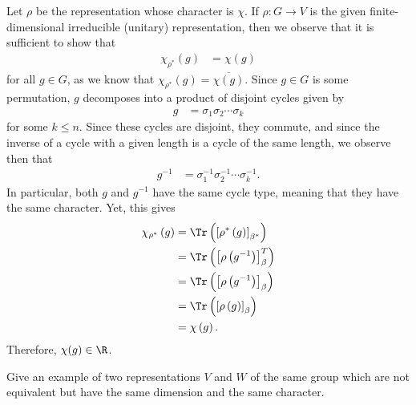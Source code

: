 \documentclass[10pt]{mypackage}
\begin{document}
\begin{solution}
  Let $\rho$ be the representation whose character is $\chi$. If $\rho\colon G\rightarrow V$ is the given finite-dimensional irreducible (unitary) representation, then we observe that it is sufficient to show that
  \begin{align*}
    \chi_{\rho^{\ast}}\left( g \right) &= \chi\left( g \right)
  \end{align*}
  for all $g\in G$, as we know that $\chi_{\rho^{\ast}}\left( g \right) = \overline{\chi\left( g \right)}$. Since $g\in G$ is some permutation, $g$ decomposes into a product of disjoint cycles given by
  \begin{align*}
    g &= \sigma_1\sigma_2\cdots \sigma_k
  \end{align*}
  for some $k\leq n$. Since these cycles are disjoint, they commute, and since the inverse of a cycle with a given length is a cycle of the same length, we observe then that
  \begin{align*}
    g^{-1} &= \sigma_1^{-1}\sigma_2^{-1}\cdots \sigma_k^{-1}.
  \end{align*}
  In particular, both $g$ and $g^{-1}$ have the same cycle type, meaning that they have the same character. Yet, this gives
  \begin{align*}
    \chi_{\rho^{\ast}}\left( g \right) &= \Tr \left( \left[ \rho^{\ast}\left( g \right) \right]_{\beta^{\ast}} \right)\\
                                       &= \Tr \left( \left[ \rho\left( g^{-1} \right) \right]_{\beta}^{T} \right)\\
                                       &= \Tr \left( \left[ \rho\left( g^{-1} \right) \right]_{\beta} \right)\\
                                       &= \Tr \left( \left[ \rho\left( g \right) \right]_{\beta} \right)\\
                                       &= \chi\left( g \right).
  \end{align*}
  Therefore, $\chi(g)\in \R$.
\end{solution}
\begin{problem}[Problem 4]
  Give an example of two representations $V$ and $W$ of the same group which are not equivalent but have the same dimension and the same character.
\end{problem}
\end{document}
